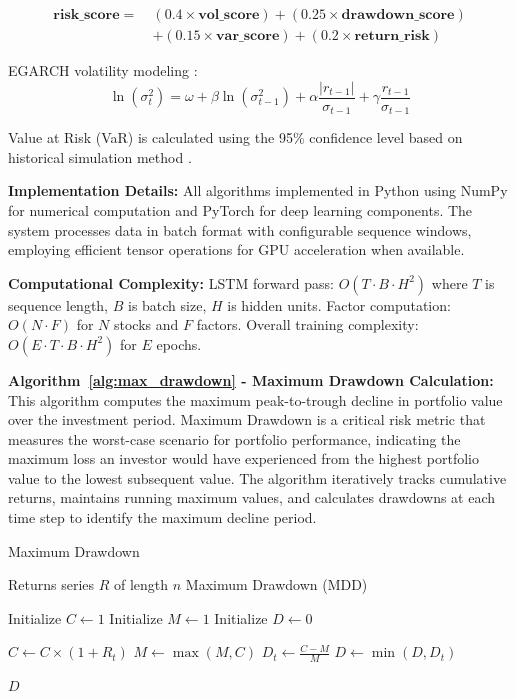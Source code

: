 \documentclass[3p,times,procedia]{elsarticle}
\begin{document}
\begin{align}
\mathbf{risk\_score} =\ & (0.4 \times \mathbf{vol\_score}) + (0.25 \times \mathbf{drawdown\_score}) \nonumber \\
& + (0.15 \times \mathbf{var\_score}) + (0.2 \times \mathbf{return\_risk})
\end{align}

EGARCH volatility modeling \cite{Nelson1991}:
\begin{equation}
\ln(\sigma_t^2) = \omega + \beta \ln(\sigma_{t-1}^2) + \alpha \frac{|r_{t-1}|}{\sigma_{t-1}} + \gamma \frac{r_{t-1}}{\sigma_{t-1}}
\end{equation}

Value at Risk (VaR) is calculated using the 95\% confidence level based on historical simulation method \cite{Jorion2001}.

\textbf{Implementation Details:} All algorithms implemented in Python using NumPy for numerical computation and PyTorch for deep learning components. The system processes data in batch format with configurable sequence windows, employing efficient tensor operations for GPU acceleration when available.

\textbf{Computational Complexity:} LSTM forward pass: $O(T \cdot B \cdot H^2)$ where $T$ is sequence length, $B$ is batch size, $H$ is hidden units. Factor computation: $O(N \cdot F)$ for $N$ stocks and $F$ factors. Overall training complexity: $O(E \cdot T \cdot B \cdot H^2)$ for $E$ epochs.

\textbf{Algorithm~\ref{alg:max_drawdown} - Maximum Drawdown Calculation:} This algorithm computes the maximum peak-to-trough decline in portfolio value over the investment period. Maximum Drawdown is a critical risk metric that measures the worst-case scenario for portfolio performance, indicating the maximum loss an investor would have experienced from the highest portfolio value to the lowest subsequent value. The algorithm iteratively tracks cumulative returns, maintains running maximum values, and calculates drawdowns at each time step to identify the maximum decline period.

\begin{algorithm}[H]
\caption{Maximum Drawdown}
\label{alg:max_drawdown}
\begin{algorithmic}[1]
    \Require Returns series \( R \) of length \( n \)
    \Ensure Maximum Drawdown (MDD)
    
    \State Initialize \( C \gets 1 \) 
    \State Initialize \( M \gets 1 \) 
    \State Initialize \( D \gets 0 \) 

        \State \( C \gets C \times (1 + R_t) \) 
        \State \( M \gets \max(M, C) \) 
        \State \( D_t \gets \frac{C - M}{M} \) 
        \State \( D \gets \min(D, D_t) \) 
    \EndFor

    \State \Return \( D \)
\end{algorithmic}
\end{algorithm}
\end{document}
